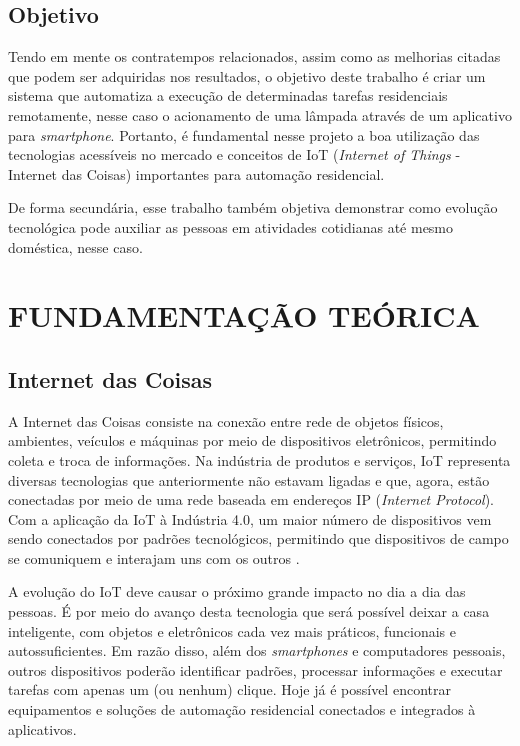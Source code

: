 \documentclass[
12pt,
openany, %
oneside, %
a4paper,			
english,			
brazil			        %
]{abntbibufjf}
\begin{document}
	
	
	
	\section{Objetivo}
	
	Tendo em mente os contratempos relacionados, assim como as melhorias citadas que podem ser adquiridas nos resultados, o objetivo deste trabalho é criar um sistema que automatiza a execução de determinadas tarefas residenciais remotamente, nesse caso o acionamento de uma lâmpada através de um aplicativo para \textit{smartphone}. Portanto, é fundamental nesse projeto a boa utilização das tecnologias acessíveis no mercado e conceitos de IoT (\textit{Internet of Things} - Internet das Coisas) importantes para automação residencial.
	
	De forma secundária, esse trabalho também objetiva demonstrar como evolução tecnológica pode auxiliar as pessoas em atividades cotidianas até mesmo doméstica, nesse caso.
	
	



	\chapter{FUNDAMENTAÇÃO TEÓRICA}
	\label{cap2}
	\section{Internet das Coisas}
    
    A Internet das Coisas consiste na conexão entre rede de objetos físicos, ambientes, veículos e máquinas por meio de dispositivos eletrônicos, permitindo coleta e troca de informações. Na indústria de produtos e serviços, IoT representa diversas tecnologias que anteriormente não estavam ligadas e que, agora, estão conectadas por meio de uma rede baseada em endereços IP (\textit{Internet Protocol}). Com a aplicação da IoT à Indústria 4.0, um maior número de dispositivos vem sendo conectados por padrões tecnológicos, permitindo que dispositivos de campo se comuniquem e interajam uns com os outros \cite{ALMEIDA}.

    A evolução do IoT deve causar o próximo grande impacto no dia a dia das pessoas. É por meio do avanço desta tecnologia que será possível deixar a casa inteligente, com objetos e eletrônicos cada vez mais práticos, funcionais e autossuficientes. Em razão disso, além dos \textit{smartphones} e computadores pessoais, outros dispositivos poderão identificar padrões, processar informações e executar tarefas com apenas um (ou nenhum) clique. Hoje já é possível encontrar equipamentos e soluções de automação residencial conectados e integrados à aplicativos.
    
\end{document}
